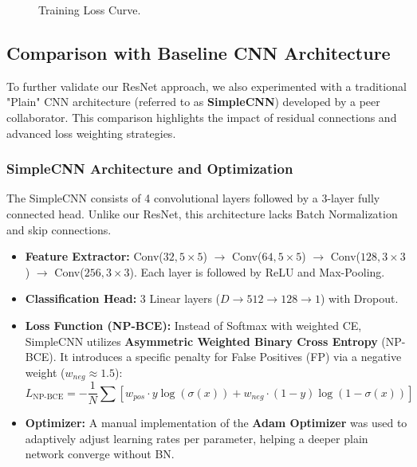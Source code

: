\begin{figure}[htbp]
    \centering
    \caption{Training Loss Curve.}
    \label{fig:loss_curve}
\end{figure}

\subsection{Comparison with Baseline CNN Architecture}
To further validate our ResNet approach, we also experimented with a traditional "Plain" CNN architecture (referred to as \textbf{SimpleCNN}) developed by a peer collaborator. This comparison highlights the impact of residual connections and advanced loss weighting strategies.

\subsubsection{SimpleCNN Architecture and Optimization}
The SimpleCNN consists of 4 convolutional layers followed by a 3-layer fully connected head. Unlike our ResNet, this architecture lacks Batch Normalization and skip connections.
\begin{itemize}
    \item \textbf{Feature Extractor:} Conv($32, 5\times5$) $\rightarrow$ Conv($64, 5\times5$) $\rightarrow$ Conv($128, 3\times3$) $\rightarrow$ Conv($256, 3\times3$). Each layer is followed by ReLU and Max-Pooling.
    \item \textbf{Classification Head:} 3 Linear layers ($D \rightarrow 512 \rightarrow 128 \rightarrow 1$) with Dropout.
    \item \textbf{Loss Function (NP-BCE):} Instead of Softmax with weighted CE, SimpleCNN utilizes \textbf{Asymmetric Weighted Binary Cross Entropy} (NP-BCE). It introduces a specific penalty for False Positives (FP) via a negative weight ($w_{neg} \approx 1.5$):
    \begin{equation}
        L_{\text{NP-BCE}} = -\frac{1}{N} \sum [w_{pos} \cdot y \log(\sigma(x)) + w_{neg} \cdot (1-y) \log(1-\sigma(x))]
    \end{equation}
    \item \textbf{Optimizer:} A manual implementation of the \textbf{Adam Optimizer} was used to adaptively adjust learning rates per parameter, helping a deeper plain network converge without BN.
\end{itemize}


